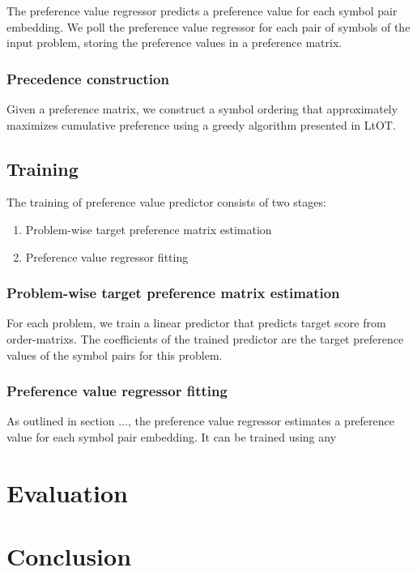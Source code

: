 The preference value regressor predicts a preference value for each symbol pair embedding.
We poll the preference value regressor for each pair of symbols of the input problem,
storing the preference values in a preference matrix.

\subsubsection{Precedence construction}

Given a preference matrix, we construct a symbol ordering
that approximately maximizes cumulative preference
using a greedy algorithm presented in LtOT.

\subsection{Training}

The training of preference value predictor consists of two stages:

\begin{enumerate}
	\item Problem-wise target preference matrix estimation
	\item Preference value regressor fitting
\end{enumerate}

\subsubsection{Problem-wise target preference matrix estimation}

For each problem,
we train a linear predictor
that predicts target score from \glspl{order-matrix}.
The coefficients of the trained predictor are the target preference values of the symbol pairs for this problem.

\subsubsection{Preference value regressor fitting}

As outlined in section ...,
the preference value regressor estimates a preference value for each symbol pair embedding.
It can be trained using any 

\section{Evaluation}
\label{sec:evaluation}

\section{Conclusion}

\glsaddall
\printglossaries





